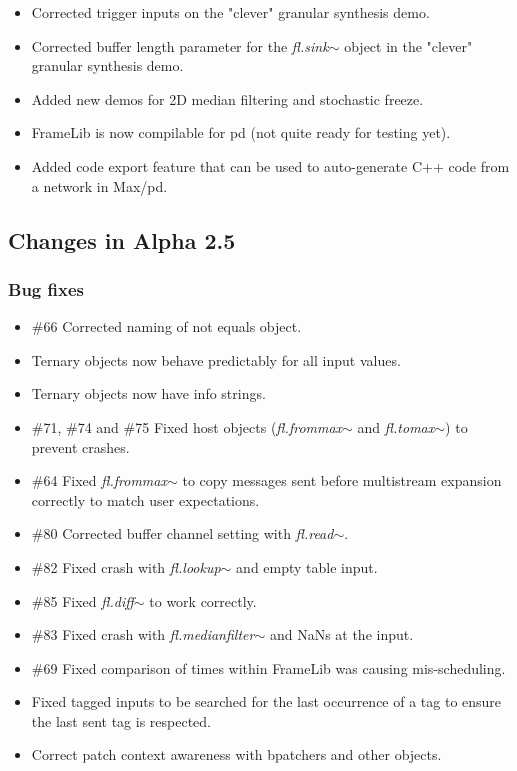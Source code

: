 \documentclass{article}
\newcommand{\flobject}[1]{\textit{fl.#1$\sim$}}
\begin{document}
\begin{itemize}
\item Corrected trigger inputs on the "clever" granular synthesis demo.
\item Corrected buffer length parameter for the  \flobject{sink} object in the "clever" granular synthesis demo.
\item Added new demos for 2D median filtering and stochastic freeze.
\item FrameLib is now compilable for pd (not quite ready for testing yet).
\item Added code export feature that can be used to auto-generate C++ code from a network in Max/pd.
\end{itemize}

\subsection{Changes in Alpha 2.5}
\vspace{0.1in}

\subsubsection{Bug fixes}

\begin{itemize}
\item {\#66} Corrected naming of not equals object.
\item Ternary objects now behave predictably for all input values.
\item Ternary objects now have info strings.
\item {\#71, \#74 and \#75} Fixed host objects (\flobject{frommax} and \flobject{tomax}) to prevent crashes.
\item  {\#64} Fixed \flobject{frommax} to copy messages sent before multistream expansion correctly to match user expectations.
\item {\#80} Corrected buffer channel setting with \flobject{read}.
\item {\#82} Fixed crash with \flobject{lookup} and empty table input.
\item {\#85} Fixed \flobject{diff} to work correctly.
\item {\#83} Fixed crash with \flobject{medianfilter} and NaNs at the input.
\item {\#69} Fixed comparison of times within FrameLib was causing mis-scheduling.
\item Fixed tagged inputs to be searched for the last occurrence of a tag to ensure the last sent tag is respected.
\item Correct patch context awareness with bpatchers and other objects.
\end{itemize}
\end{document}
